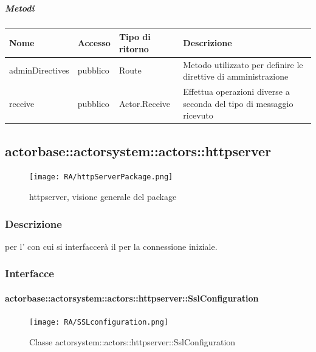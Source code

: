 \documentclass{scalatekids-article}
\begin{document}
\subparagraph{Metodi}

\begin{tabular}{| l | l | l | l |}
  \hline
  Nome & Accesso & Tipo di ritorno & Descrizione\\
  \hline
  adminDirectives & pubblico & Route & Metodo utilizzato per definire le direttive di amministrazione\\
  \hline
  receive & pubblico & Actor.Receive & Effettua operazioni diverse a seconda del tipo di messaggio ricevuto\\
  \hline
\end{tabular}


\subsection{actorbase::actorsystem::actors::httpserver}
\label{sec:actorbase::actorsystem::actors::httpserver}

\begin{figure}[H]
  \begin{center}
    \texttt{[image: RA/httpServerPackage.png]}
    \caption{httpserver, visione generale del package}
  \end{center}
\end{figure}

\subsubsection{Descrizione}
 per l' con cui si interfaccerà il  per la connessione iniziale.

\subsubsection{Interfacce}

\paragraph{actorbase::actorsystem::actors::httpserver::SslConfiguration}
\label{sec:actorbase::actorsystem::actors::httpserver::SslConfiguration}

\begin{figure}[H]
  \begin{center}
    \texttt{[image: RA/SSLconfiguration.png]}
    \caption{Classe actorsystem::actors::httpserver::SslConfiguration}
  \end{center}
\end{figure}
\end{document}
